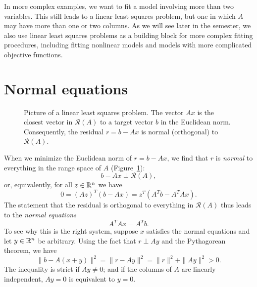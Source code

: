 \documentclass[12pt, leqno]{article}
\begin{document}
In more complex examples, we want to fit a model involving more than
two variables.  This still leads to a linear least squares problem,
but one in which $A$ may have more than one or two columns.  As we
will see later in the semester, we also use linear least squares
problems as a building block for more complex fitting procedures,
including fitting nonlinear models and models with more complicated
objective functions.

\section*{Normal equations}

\begin{figure} 
  \begin{center}
  \end{center}
  \caption{Picture of a linear least squares problem.  The vector $Ax$
           is the closest vector in $\mathcal{R}(A)$ to a target
           vector $b$ in the Euclidean norm.  Consequently, the
           residual $r = b-Ax$ is normal (orthogonal) to
           $\mathcal{R}(A)$.}
  \label{fig1}
\end{figure}

When we minimize the Euclidean norm of $r = b-Ax$, we find that $r$ is
{\em normal} to everything in the range space of $A$ (Figure~\ref{fig1}):
\[
  b-Ax \perp \mathcal{R}(A),
\]
or, equivalently, for all $z \in \mathbb{R}^n$ we have
\[
  0 = (Az)^T (b-Ax) = z^T(A^T b - A^T A x).
\]
The statement that the residual is orthogonal to everything in
$\mathcal{R}(A)$ thus leads to the {\em normal equations}
\[
  A^T A x = A^T b.
\]
To see why this is the right system, suppose $x$ satisfies the normal
equations and let $y \in \mathbb{R}^{n}$ be arbitrary.  Using the fact that
$r \perp Ay$ and the Pythagorean theorem, we have
\[
  \|b-A(x+y)\|^2 = \|r-Ay\|^2 = \|r\|^2 + \|Ay\|^2 > 0.
\]
The inequality is strict if $Ay \neq 0$; and if the columns of
$A$ are linearly independent, $Ay = 0$ is equivalent to $y = 0$.
\end{document}
